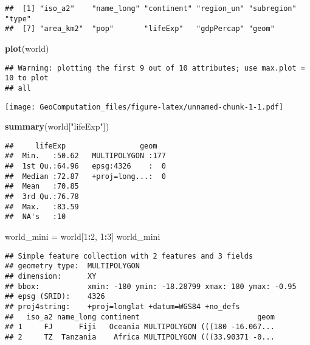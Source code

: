 \documentclass[]{article}
\newenvironment{Shaded}{\begin{snugshade}}{\end{snugshade}}
\newcommand{\DecValTok}[1]{\textcolor[rgb]{0.00,0.00,0.81}{#1}}
\newcommand{\KeywordTok}[1]{\textcolor[rgb]{0.13,0.29,0.53}{\textbf{#1}}}
\newcommand{\NormalTok}[1]{#1}
\newcommand{\OperatorTok}[1]{\textcolor[rgb]{0.81,0.36,0.00}{\textbf{#1}}}
\newcommand{\StringTok}[1]{\textcolor[rgb]{0.31,0.60,0.02}{#1}}
\begin{document}
\begin{verbatim}
##  [1] "iso_a2"    "name_long" "continent" "region_un" "subregion" "type"     
##  [7] "area_km2"  "pop"       "lifeExp"   "gdpPercap" "geom"
\end{verbatim}

\begin{Shaded}
\begin{Highlighting}[]
\KeywordTok{plot}\NormalTok{(world)}
\end{Highlighting}
\end{Shaded}

\begin{verbatim}
## Warning: plotting the first 9 out of 10 attributes; use max.plot = 10 to plot
## all
\end{verbatim}

\texttt{[image: GeoComputation\_files/figure-latex/unnamed-chunk-1-1.pdf]}

\begin{Shaded}
\begin{Highlighting}[]
\KeywordTok{summary}\NormalTok{(world[}\StringTok{"lifeExp"}\NormalTok{])}
\end{Highlighting}
\end{Shaded}

\begin{verbatim}
##     lifeExp                 geom    
##  Min.   :50.62   MULTIPOLYGON :177  
##  1st Qu.:64.96   epsg:4326    :  0  
##  Median :72.87   +proj=long...:  0  
##  Mean   :70.85                      
##  3rd Qu.:76.78                      
##  Max.   :83.59                      
##  NA's   :10
\end{verbatim}

\begin{Shaded}
\begin{Highlighting}[]
\NormalTok{world_mini =}\StringTok{ }\NormalTok{world[}\DecValTok{1}\OperatorTok{:}\DecValTok{2}\NormalTok{, }\DecValTok{1}\OperatorTok{:}\DecValTok{3}\NormalTok{]}
\NormalTok{world_mini}
\end{Highlighting}
\end{Shaded}

\begin{verbatim}
## Simple feature collection with 2 features and 3 fields
## geometry type:  MULTIPOLYGON
## dimension:      XY
## bbox:           xmin: -180 ymin: -18.28799 xmax: 180 ymax: -0.95
## epsg (SRID):    4326
## proj4string:    +proj=longlat +datum=WGS84 +no_defs
##   iso_a2 name_long continent                           geom
## 1     FJ      Fiji   Oceania MULTIPOLYGON (((180 -16.067...
## 2     TZ  Tanzania    Africa MULTIPOLYGON (((33.90371 -0...
\end{verbatim}
\end{document}
